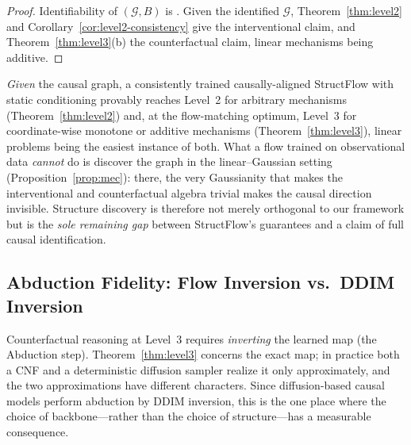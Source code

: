 \begin{proof}
Identifiability of $(\mathcal{G}, B)$ is \citet{shimizu2006lingam}. Given the identified
$\mathcal{G}$, Theorem~\ref{thm:level2} and Corollary~\ref{cor:level2-consistency} give the
interventional claim, and Theorem~\ref{thm:level3}(b) the counterfactual claim, linear
mechanisms being additive.
\end{proof}

\begin{remark}
\label{rem:hierarchy-summary}
\emph{Given} the causal graph, a consistently trained causally-aligned StructFlow with
static conditioning provably reaches Level~2 for arbitrary mechanisms
(Theorem~\ref{thm:level2}) and, at the flow-matching optimum, Level~3 for coordinate-wise
monotone or additive mechanisms (Theorem~\ref{thm:level3}), linear problems being the
easiest instance of both. What a flow trained on observational data \emph{cannot} do is
discover the graph in the linear--Gaussian setting (Proposition~\ref{prop:mec}): there, the
very Gaussianity that makes the interventional and counterfactual algebra trivial makes the
causal direction invisible. Structure discovery is therefore not merely orthogonal to our
framework but is the \emph{sole remaining gap} between StructFlow's guarantees and a claim of
full causal identification.
\end{remark}

\subsection{Abduction Fidelity: Flow Inversion vs.\ DDIM Inversion}
\label{app:inversion}

Counterfactual reasoning at Level~3 requires \emph{inverting} the learned map (the Abduction
step). Theorem~\ref{thm:level3} concerns the exact map; in practice both a CNF and a
deterministic diffusion sampler realize it only approximately, and the two approximations
have different characters. Since diffusion-based causal models
\citep{sanchez2022diffusion, chao2023interventional} perform abduction by DDIM inversion,
this is the one place where the choice of backbone---rather than the choice of
structure---has a measurable consequence.

